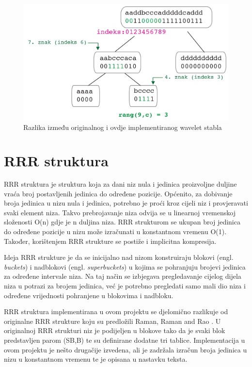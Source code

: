\begin{figure}[H]
\centering
\includegraphics[width=\linewidth]{./pictures/Waveletquery.jpg}
\caption{Razlika između originalnog i ovdje implementiranog wavelet stabla}\label{query}
\end{figure}


\section{RRR struktura}
RRR struktura je struktura koja za dani niz nula i jedinica proizvoljne duljine vraća broj postavljenih jedinica do određene pozicije. Općenito, za dobivanje broja jedinica u nizu nula i jedinica, potrebno je proći kroz cijeli niz i provjeravati svaki element niza. Takvo prebrojavanje niza odvija se u linearnoj vremenskoj složenosti O(n) gdje je n duljina niza. RRR strukturom se ukupan broj jedinica do određene pozicije u nizu može izračunati u konstantnom vremenu O(1). Također, korištenjem RRR strukture se postiže i implicitna kompresija. 

Ideja RRR strukture je da se inicijalno nad nizom konstruiraju blokovi (engl. \textit{buckets}) i nadblokovi (engl. \textit{superbuckets}) u kojima se pohranjuju brojevi jedinica za određene intervale niza. Na taj način se izbjegava pregledavanje cijelog dijela niza u potrazi za brojem jedinica, već je potrebno pregledati samo mali dio niza i određene vrijednosti pohranjene u blokovima i nadbloku. 

RRR struktura implementirana u ovom projektu se djelomično razlikuje od originalne RRR strukture koju su predložili Raman, Raman and Rao \cite{rrr1}. U originalnoj RRR strukturi niz je podijeljen u blokove tako da je svaki blok predstavljen parom (SB,B) te su definirane dodatne tri tablice\cite{rrr2}. Implementacija u ovom projektu je nešto drugačije izvedena, ali je zadržala izračun broja jedinica u nizu u konstantnom vremenu te je opisana u nastavku teksta.

